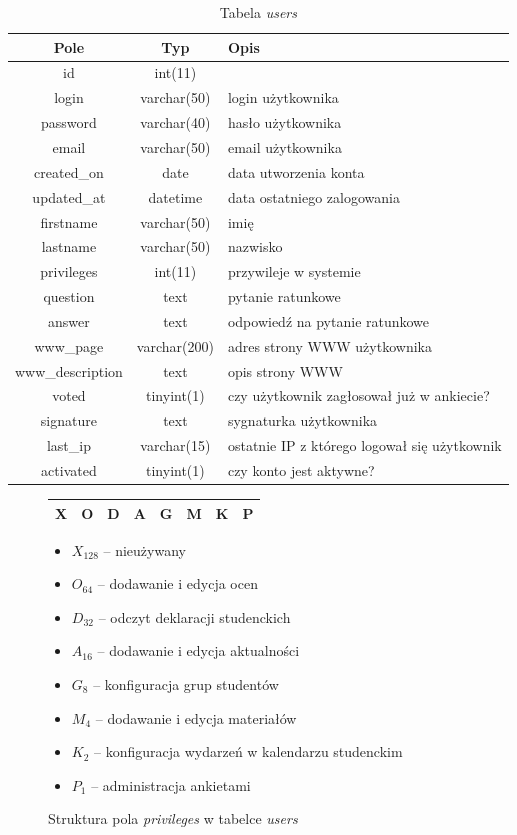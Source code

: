 \documentclass[a4paper,12pt,oneside]{report}
\begin{document}
\begin{table}[h]
  \centering
  \begin{tabular}{|c|c|l|}\hline
  Pole & Typ & Opis \\\hline
  id              & int(11)      & \\
  login           & varchar(50)  & login użytkownika \\
  password        & varchar(40)  & hasło użytkownika \\
  email           & varchar(50)  & email użytkownika \\
  created\_on      & date         & data utworzenia konta \\
  updated\_at      & datetime     & data ostatniego zalogowania\\
  firstname       & varchar(50)  & imię \\
  lastname        & varchar(50)  & nazwisko \\
  privileges      & int(11)      & przywileje w systemie \\
  question        & text         & pytanie ratunkowe \\
  answer          & text         & odpowiedź na pytanie ratunkowe \\
  www\_page        & varchar(200) & adres strony WWW użytkownika\\
  www\_description & text         & opis strony WWW \\
  voted           & tinyint(1)   & czy użytkownik zagłosował już w ankiecie? \\
  signature       & text         & sygnaturka użytkownika \\
  last\_ip         & varchar(15)  & ostatnie IP z którego logował się użytkownik \\
  activated       & tinyint(1)   & czy konto jest aktywne? \\\hline
  \end{tabular}
  \caption{Tabela \emph{users}\label{tab:users}}
\end{table}
\begin{figure}[h]
  \centering
  \begin{tabular}{|c|c|c|c|c|c|c|c|}\hline
    X & O & D & A & G & M & K & P \\\hline
  \end{tabular}
  \begin{itemize}
    \item $X_{128}$ -- nieużywany
    \item $O_{64}$ -- dodawanie i edycja ocen
    \item $D_{32}$ -- odczyt deklaracji studenckich
    \item $A_{16}$ -- dodawanie i edycja aktualności
    \item $G_8$ -- konfiguracja grup studentów
    \item $M_4$ -- dodawanie i edycja materiałów
    \item $K_2$ -- konfiguracja wydarzeń w kalendarzu studenckim
    \item $P_1$ -- administracja ankietami
  \end{itemize}
  \caption{Struktura pola \emph{privileges} w tabelce \emph{users}\label{fig:privileges}}
\end{figure}
\end{document}
